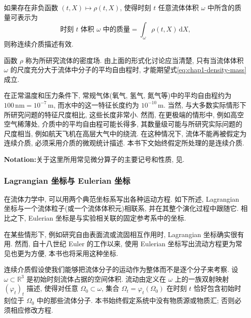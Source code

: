 \begin{Definition}
\label{def:chap1-density-field}
如果存在非负函数 $(t,X)\mapsto\rho(t,X)$, 使得时刻 $t$ 任意流体体积 $\omega$ 中所含的质量可表示为
\begin{equation}
\label{eq:chap1-density-mass}
  \text{时刻 $t$ 体积 $\omega$ 中的质量}
  =\int_{\omega}\rho(t,X)\,\mathrm{d}X,
\end{equation}
则称连续介质描述有效.
\end{Definition}

函数 $\rho$ 称为所研究流体的密度场. 由上面的形式化讨论应当清楚, 只有当流体体积 $\omega$ 的尺度充分大于流体中分子的平均自由程时, 才能期望式\eqref{eq:chap1-density-mass}成立.

在正常温度和压力条件下, 常规气体(氧气, 氢气, 氮气等)中的平均自由程约为 $100\,\mathrm{nm}=10^{-7}\,\mathrm{m}$, 而水中的这一特征长度约为 $10^{-10}\,\mathrm{m}$. 当然, 与大多数实际情形下所研究问题的特征尺度相比, 这些长度非常小. 然而, 在更极端的情形中, 例如高空空气稀薄处, 介质中的平均自由程可能长得多, 其数量级可能与所研究实际问题的尺度相当, 例如航天飞机在高层大气中的绕流. 在这种情况下, 流体不能再被假定为连续介质, 必须采用介质的微观统计描述. 本书下文始终假定所处理的是连续介质.

\noindent\textbf{Notation:}\quad 关于这里所用常见微分算子的主要记号和性质, 见.

\subsubsection{Lagrangian 坐标与 Eulerian 坐标}
\label{subsec:chap1-lagrangian-eulerian}

在流体力学中, 可以用两个典范坐标系写出各种运动方程. 如下所述, Lagrangian 坐标与一个流体粒子(或一个流体体积元)相联系, 并在其整个演化过程中跟随它. 相比之下, Eulerian 坐标是与实验相关联的固定参考系中的坐标.

在某些情形下, 例如研究自由表面流或流固相互作用时, Lagrangian 坐标确实很有用. 然而, 自十八世纪 Euler 的工作以来, 使用 Eulerian 坐标写出流动方程更为常见也更为方便, 本书也将采用这种坐标.

连续介质假设使我们能够把流体分子的运动作为整体而不是逐个分子来考察. 设 $\omega\subset\mathbb{R}^3$ 是初始时刻流体占据的空间体积. 流动由定义在 $\omega$ 上的一族双射映射 $(\varphi_t)_t$ 描述, 使得对任意 $\Omega_0\subset\omega$, 集合 $\Omega_t=\varphi_t(\Omega_0)$ 在时刻 $t$ 恰好包含初始时刻位于 $\Omega_0$ 中的那些流体分子. 本书始终假定系统中没有物质源或物质汇; 否则必须相应修改方程.

